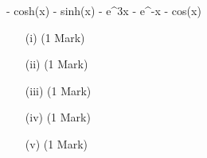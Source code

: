  - cosh(x)
 - sinh(x)
 - e^{3x}
 - e^{-x}
 - cos(x)




\begin{itemize}
\item[(i)] (1 Mark)

\item[(ii)] (1 Mark)

\item[(iii)] (1 Mark)

\item[(iv)] (1 Mark)

\item[(v)] (1 Mark)

\end{itemize}

